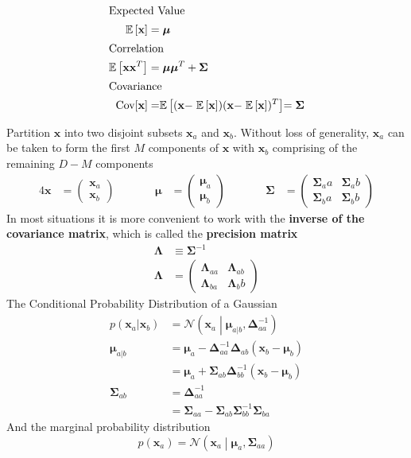 \documentclass[11pt]{article}
\theoremstyle{definition}
\newcommand*\ev[1]{\mathrel{\mathbb{E}\left[#1\right]}}
\newcommand*\N[1]{\mathcal{N}\left(#1\right)}
\begin{document}
\begin{definition}
	\begin{align*}
		\intertext{Expected Value}
		\ev{\textbf{x}} &= \bm{\mu}\\
		\intertext{Correlation}
		\ev{\textbf{xx}^T} &= \bm{\mu\mu}^T + \bm{\Sigma}\\
		\intertext{Covariance}
		\text{Cov}[\textbf{x}] &= \ev{(\textbf{x}-\ev{\textbf{x}})(\textbf{x}-\ev{\textbf{x}})^T} = \bm{\Sigma}
	\end{align*}
\end{definition}

Partition $\textbf{x}$ into two disjoint subsets $\textbf{x}_a$ and $\textbf{x}_b$. Without loss of generality, $\textbf{x}_a$ can be taken to form the first $M$ components of $\textbf{x}$ with $\textbf{x}_b$ comprising of the remaining $D-M$ components
\begin{alignat*}{4}
	\textbf{x}&=\begin{pmatrix}\textbf{x}_a\\\textbf{x}_b\end{pmatrix} &\qquad& \bm{\mu} &= \begin{pmatrix}\bm{\mu}_a\\\bm{\mu}_b\end{pmatrix} &\qquad& \bm{\Sigma} &= \begin{pmatrix}\bm{\Sigma}_aa & \bm{\Sigma}_ab \\\bm{\Sigma}_ba & \bm{\Sigma}_bb\end{pmatrix}
\end{alignat*}
In most situations it is more convenient to work with the \textbf{inverse of the covariance matrix}, which is called the \textbf{precision matrix}
\begin{align*}
	\bm{\Lambda} &\equiv \bm{\Sigma}^{-1}\\
	\bm{\Lambda} &= \begin{pmatrix}
		\bm{\Lambda}_{aa} & \bm{\Lambda}_{ab}\\
		\bm{\Lambda}_{ba} & \bm{\Lambda}_bb
	\end{pmatrix}
\end{align*}
The Conditional Probability Distribution of a Gaussian
\begin{align*}
	p(\textbf{x}_a| \textbf{x}_b) &= \N{\textbf{x}_a\middle| \bm{\mu}_{a|b}, \bm{\Delta}^{-1}_{aa}}\\
	\bm{\mu}_{a|b} &= \bm{\mu}_{a} - \bm{\Delta}^{-1}_{aa}\bm{\Delta}_{ab}(\textbf{x}_b-\bm{\mu}_b)\\
	&= \bm{\mu}_{a} + \bm{\Sigma}_{ab}\bm{\Delta}^{-1}_{bb}(\textbf{x}_b-\bm{\mu}_b)\\
	\bm{\Sigma}_{ab} &= \bm{\Delta}^{-1}_{aa}\\
	&= \bm{\Sigma}_{aa} - \bm{\Sigma}_{ab}\bm{\Sigma}^{-1}_{bb}\bm{\Sigma}_{ba}
\end{align*}
And the marginal probability distribution
\begin{equation*}
	p(\textbf{x}_a) = \N{\textbf{x}_a\middle| \bm{\mu}_{a}, \bm{\Sigma}_{aa}}
\end{equation*}
\end{document}
